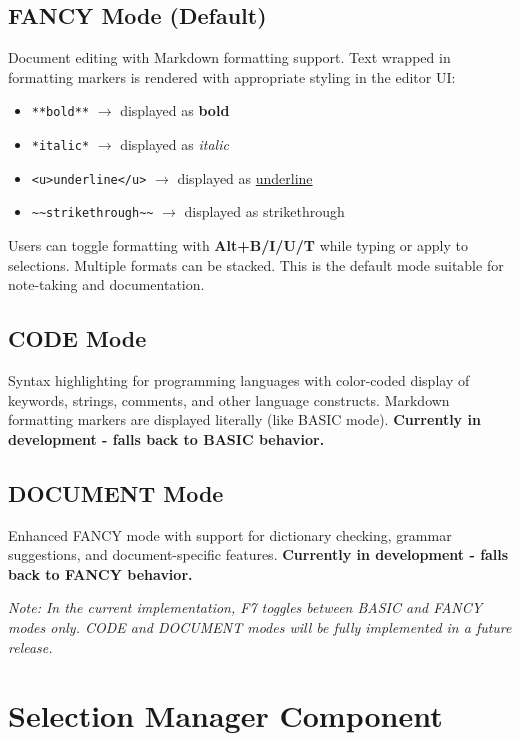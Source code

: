 \documentclass[12pt,a4paper,oneside,openany]{report}
\begin{document}
\subsection{FANCY Mode (Default)}

Document editing with Markdown formatting support. Text wrapped in formatting markers is rendered with appropriate styling in the editor UI:
\begin{itemize}
	\item \texttt{**bold**} $\rightarrow$ displayed as \textbf{bold}
	\item \texttt{*italic*} $\rightarrow$ displayed as \textit{italic}
	\item \texttt{<u>underline</u>} $\rightarrow$ displayed as \underline{underline}
	\item \texttt{\textasciitilde\textasciitilde strikethrough\textasciitilde\textasciitilde} $\rightarrow$ displayed as strikethrough
\end{itemize}
Users can toggle formatting with \textbf{Alt+B/I/U/T} while typing or apply to selections. Multiple formats can be stacked. This is the default mode suitable for note-taking and documentation.

\subsection{CODE Mode}

Syntax highlighting for programming languages with color-coded display of keywords, strings, comments, and other language constructs. Markdown formatting markers are displayed literally (like BASIC mode). \textbf{Currently in development - falls back to BASIC behavior.}

\subsection{DOCUMENT Mode}

Enhanced FANCY mode with support for dictionary checking, grammar suggestions, and document-specific features. \textbf{Currently in development - falls back to FANCY behavior.}

\medskip
\textit{Note: In the current implementation, F7 toggles between BASIC and FANCY modes only. CODE and DOCUMENT modes will be fully implemented in a future release.}

\section{Selection Manager Component}
\end{document}
